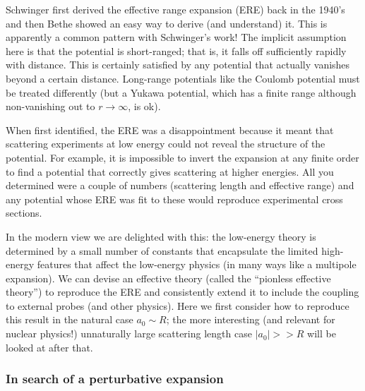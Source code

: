 Schwinger first derived the effective range expansion (ERE) back in
  the 1940's and then Bethe showed an easy way to derive (and
  understand) it.  This is apparently a common pattern with Schwinger's work!
The implicit assumption here is that the potential is
  short-ranged; that is, it falls off sufficiently rapidly with
  distance.  This is certainly satisfied by any potential that actually
  vanishes beyond a certain distance.  Long-range potentials like the
  Coulomb potential must be treated differently (but a Yukawa potential, which
  has a finite range although non-vanishing out to $r \rightarrow\infty$, is ok).

When first identified, the ERE was a disappointment because it meant that scattering
experiments at low energy could not reveal the structure of the potential.  
For example, it is impossible to invert the expansion at any finite order to find a potential that
correctly gives scattering at higher energies.
All you determined were a couple of numbers (scattering length and effective range) and any
potential whose ERE was fit to these would reproduce experimental cross sections.     

In the modern view we are delighted with this:  the low-energy theory is determined
by a small number of constants that encapsulate the limited high-energy features 
that affect the low-energy physics (in many ways like a multipole expansion).
We can devise an effective theory (called the ``pionless effective theory'')
to reproduce the ERE and consistently extend it to include the coupling to external probes
(and other physics). Here we first consider how to reproduce this result in the natural case $a_0\sim R$; the more interesting (and relevant for nuclear physics!) unnaturally large scattering length case $|a_0| >> R$ will be looked at after that. 



\subsubsection{In search of a perturbative expansion}

